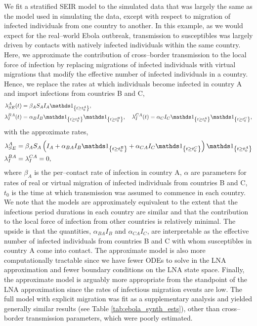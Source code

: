 We fit a stratified SEIR model to the simulated data that was largely the same as the model used in simulating the data, except with respect to migration of infected individuals from one country to another. In this example, as we would expect for the real--world Ebola outbreak, transmission to susceptibles was largely driven by contacts with natively infected individuals within the same country. Here, we approximate the contribution of cross--border transmission to the local force of infection by replacing migrations of infected individuals with virtual migrations that modify the effective number of infected individuals in a country. Hence, we replace the rates at which individuals become infected in country A and import infections from countries B and C,
\begin{align}
\label{eqn:foi_migration}
\lambda_{SE}^A(t) &= \beta_A S_A I_A\ind{t\geq t_{0}^A}, \\
\lambda_I^{BA}(t) &= \alpha_BI_B\ind{t\geq t_{0}^A}\ind{t\geq t_{0}^B},\ \hspace{0.1in} \lambda_I^{CA}(t) = \alpha_CI_C\ind{t\geq t_{0}^A}\ind{t\geq t_{0}^C},
\end{align}
with the approximate rates,
\begin{align}
\label{eqn:foi_virtual}
\lambda_{SE}^A &= \beta_AS_A\left (I_A + \alpha_{BA}I_B\ind{t\geq t_{0}^B} + \alpha_{CA}I_C\ind{t\geq t_{0}^C}\right )\ind{t\geq t_{0}^A}\\
\lambda_I^{BA} &= \lambda_I^{CA} = 0,
\end{align}
where $ \beta_A $ is the per--contact rate of infection in country A, $ \alpha $ are parameters for rates of real or virtual migration of infected individuals from countries B and C, $ t_0 $ is the time at which transmission was assumed to commence in each country. We note that the models are approximately equivalent to the extent that the infectious period durations in each country are similar and that the contribution to the local force of infection from other countries is relatively minimal. The upside is that the quantities, $ \alpha_{BA}I_B $ and $ \alpha_{CA}I_C$, are interpretable as the effective number of infected individuals from countries B and C with whom susceptibles in country A come into contact. The approximate model is also more computationally tractable since we have fewer ODEs to solve in the LNA approximation and fewer boundary conditions on the LNA state space. Finally, the approximate model is arguably more appropriate from the standpoint of the LNA approximation since the rates of infectious migration events are low. The full model with explicit migration was fit as a supplementary analysis and yielded generally similar results (see Table \ref{tab:ebola_synth_ests}), other than cross--border transmission parameters, which were poorly estimated.  


